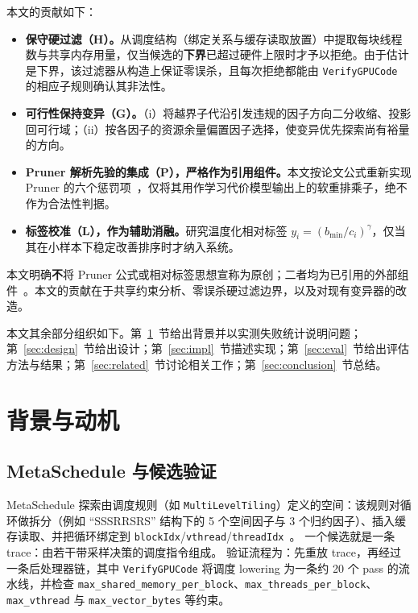 \documentclass[UTF8]{ctexart}
\begin{document}
本文的贡献如下：

\begin{itemize}
\item \textbf{保守硬过滤（H）。}从调度结构（绑定关系与缓存读取放置）中提取每块线程数与共享内存用量，仅当候选的\textbf{下界}已超过硬件上限时才予以拒绝。由于估计是下界，该过滤器从构造上保证零误杀，且每次拒绝都能由 \texttt{VerifyGPUCode} 的相应子规则确认其非法性。
\item \textbf{可行性保持变异（G）。}（i）将越界子代沿引发违规的因子方向二分收缩、投影回可行域；（ii）按各因子的资源余量偏置因子选择，使变异优先探索尚有裕量的方向。
\item \textbf{Pruner 解析先验的集成（P），严格作为引用组件。}本文按论文公式重新实现 Pruner 的六个惩罚项~\cite{pruner}，仅将其用作学习代价模型输出上的软重排乘子，绝不作为合法性判据。
\item \textbf{标签校准（L），作为辅助消融。}研究温度化相对标签 $y_i=(b_{\min}/c_i)^\gamma$，仅当其在小样本下稳定改善排序时才纳入系统。
\end{itemize}

本文明确\textbf{不}将 Pruner 公式或相对标签思想宣称为原创；二者均为已引用的外部组件~\cite{pruner}。本文的贡献在于共享约束分析、零误杀硬过滤边界，以及对现有变异器的改造。

本文其余部分组织如下。第~\ref{sec:background}~节给出背景并以实测失败统计说明问题；第~\ref{sec:design}~节给出设计；第~\ref{sec:impl}~节描述实现；第~\ref{sec:eval}~节给出评估方法与结果；第~\ref{sec:related}~节讨论相关工作；第~\ref{sec:conclusion}~节总结。

\section{背景与动机}
\label{sec:background}

\subsection{MetaSchedule 与候选验证}

MetaSchedule 探索由调度规则（如 \texttt{MultiLevelTiling}）定义的空间：该规则对循环做拆分（例如 ``SSSRRSRS'' 结构下的 5 个空间因子与 3 个归约因子）、插入缓存读取、并把循环绑定到 \texttt{blockIdx}/\texttt{vthread}/\texttt{threadIdx}~\cite{metaschedule}。
一个候选就是一条 trace：由若干带采样决策的调度指令组成。
验证流程为：先重放 trace，再经过一条后处理器链，其中 \texttt{VerifyGPUCode} 将调度 lowering 为一条约 20 个 pass 的流水线，并检查 \texttt{max\_shared\_memory\_per\_block}、\texttt{max\_threads\_per\_block}、\texttt{max\_vthread} 与 \texttt{max\_vector\_bytes} 等约束。
\end{document}
